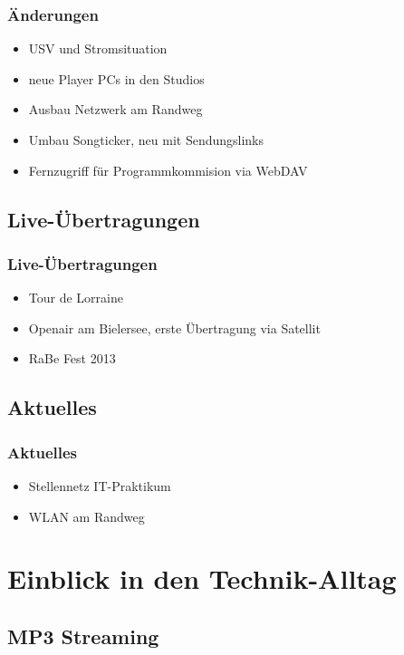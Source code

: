 \documentclass{beamer}
\begin{document}
  \frame
  {
  }

  \frame
  {
    \frametitle{\"Anderungen}

    \begin{itemize}[<+->]
    \item{USV und Stromsituation}
    \item{neue Player PCs in den Studios}
    \item{Ausbau Netzwerk am Randweg}
    \item{Umbau Songticker, neu mit Sendungslinks}
    \item{Fernzugriff f\"ur Programmkommision via WebDAV}
    \end{itemize}
  }

  \subsection*{Live-\"Ubertragungen}

  \frame
  {
  }

  \frame
  {
    \frametitle{Live-\"Ubertragungen}

    \begin{itemize}[<+->]
    \item{Tour de Lorraine}
    \item{Openair am Bielersee, erste \"Ubertragung via Satellit}
    \item{RaBe Fest 2013}
    \end{itemize}
  }

  \subsection*{Aktuelles}

  \frame
  {
  }

  \frame
  {
    \frametitle{Aktuelles}
    
    \begin{itemize}[<+->]
    \item{Stellennetz IT-Praktikum}
    \item{WLAN am Randweg}
    \end{itemize}
  }

  \section*{Einblick in den Technik-Alltag}

  \subsection*{MP3 Streaming}
\end{document}

